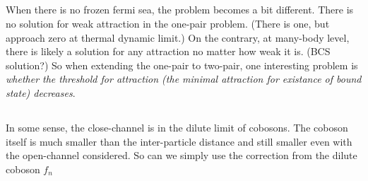 \subsection{}
When there is no frozen fermi sea, the problem becomes a bit different.  There is no solution for weak attraction in the one-pair problem. (There is one, but approach zero at thermal dynamic limit.)  On the contrary, at many-body level, there is likely a solution for any attraction no matter how weak it is. (BCS solution?)  So when extending the one-pair to two-pair, one interesting problem is \emph{whether the threshold for attraction (the minimal attraction for existance of bound state) decreases}.  


\subsection{}
In some sense, the close-channel is in the dilute limit of cobosons. The coboson itself is much smaller than the inter-particle distance and still smaller even with the open-channel considered.  So can we simply use the correction from the dilute coboson $f_n$